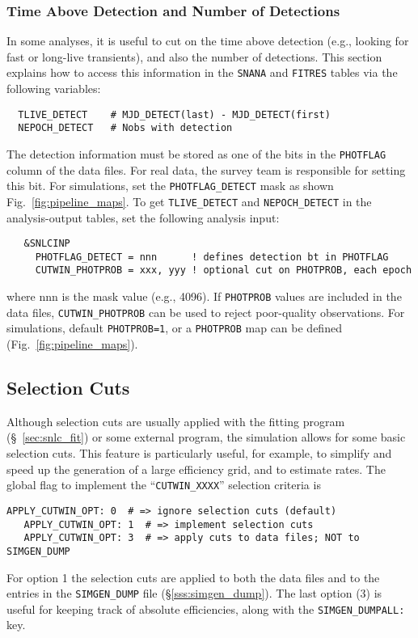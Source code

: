 \documentclass[12pt]{article}
\begin{document}
{%
   \clearpage
   \subsubsection{Time Above Detection and Number of Detections}
   \label{sssec:detect_var}

In some analyses, it is useful to cut on the time above detection
(e.g., looking for fast or long-live transients), and also the
number of detections. This section explains how to access this
information in the {\tt SNANA} and {\tt FITRES} tables via
the following variables:
%
\begin{verbatim}
  TLIVE_DETECT    # MJD_DETECT(last) - MJD_DETECT(first)
  NEPOCH_DETECT   # Nobs with detection
\end{verbatim}
%
The detection information must be stored as one of the bits in the
{\tt PHOTFLAG} column of the data files. For real data, the survey
team is responsible for setting this bit. For simulations, set the
{\tt PHOTFLAG\_DETECT} mask as shown Fig.~\ref{fig:pipeline_maps}.
To get {\tt TLIVE\_DETECT} and {\tt NEPOCH\_DETECT} in the
analysis-output tables, set the following analysis input:
\begin{verbatim}                                                               
   &SNLCINP
     PHOTFLAG_DETECT = nnn      ! defines detection bt in PHOTFLAG
     CUTWIN_PHOTPROB = xxx, yyy ! optional cut on PHOTPROB, each epoch
\end{verbatim}                                                                
%
where nnn is the mask value (e.g., 4096).
If {\tt PHOTPROB} values are included in the data files,
{\tt CUTWIN\_PHOTPROB} can be used to reject poor-quality 
observations. For simulations, default {\tt PHOTPROB=1},
or a {\tt PHOTPROB} map can be defined (Fig.~\ref{fig:pipeline_maps}).

   \clearpage
   \subsection{Selection Cuts }
   \label{subsec:simcuts}

Although selection cuts are usually applied with the
fitting program (\S~\ref{sec:snlc_fit}) 
or some external program, the simulation
allows for some basic selection cuts. This feature
is particularly useful, for example, to simplify and 
speed up the generation of a large efficiency grid,
and to estimate rates.
The global flag to implement the ``{\tt CUTWIN\_XXXX}'' 
selection criteria is
%
\begin{Verbatim}[frame=single]
   APPLY_CUTWIN_OPT: 0  # => ignore selection cuts (default)
   APPLY_CUTWIN_OPT: 1  # => implement selection cuts 
   APPLY_CUTWIN_OPT: 3  # => apply cuts to data files; NOT to SIMGEN_DUMP
\end{Verbatim}
%
For option 1 the selection cuts are applied to both the data files
and to the entries in the {\tt SIMGEN\_DUMP} file
(\S\ref{sss:simgen_dump}).
The last option (3) is useful for keeping track of absolute
efficiencies, along with the {\tt SIMGEN\_DUMPALL:} key.
%

}
\end{document}
